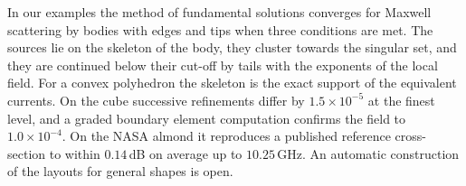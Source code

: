 In our examples the method of fundamental solutions converges for Maxwell scattering by bodies with edges and tips when three conditions are met. The sources lie on the skeleton of the body, they cluster towards the singular set, and they are continued below their cut-off by tails with the exponents of the local field. For a convex polyhedron the skeleton is the exact support of the equivalent currents. On the cube successive refinements differ by $1.5\times10^{-5}$ at the finest level, and a graded boundary element computation confirms the field to $1.0\times10^{-4}$. On the NASA almond it reproduces a published reference cross-section to within $0.14$\,dB on average up to $10.25$\,GHz. An automatic construction of the layouts for general shapes is open.
